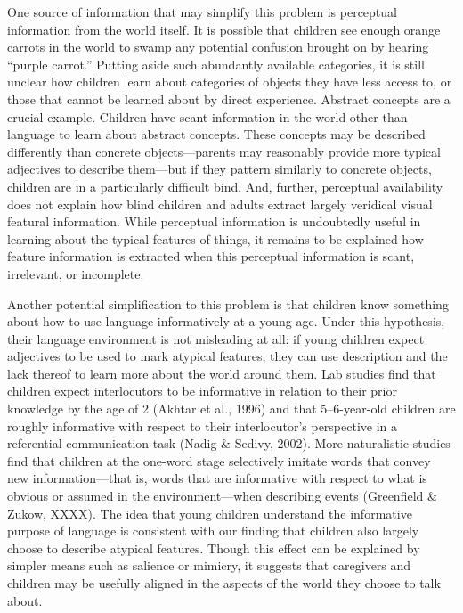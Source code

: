 \documentclass[10pt, letterpaper]{article}
\begin{document}
One source of information that may simplify this problem is perceptual
information from the world itself. It is possible that children see
enough orange carrots in the world to swamp any potential confusion
brought on by hearing ``purple carrot.'' Putting aside such abundantly
available categories, it is still unclear how children learn about
categories of objects they have less access to, or those that cannot be
learned about by direct experience. Abstract concepts are a crucial
example. Children have scant information in the world other than
language to learn about abstract concepts. These concepts may be
described differently than concrete objects---parents may reasonably
provide more typical adjectives to describe them---but if they pattern
similarly to concrete objects, children are in a particularly difficult
bind. And, further, perceptual availability does not explain how blind
children and adults extract largely veridical visual featural
information. While perceptual information is undoubtedly useful in
learning about the typical features of things, it remains to be
explained how feature information is extracted when this perceptual
information is scant, irrelevant, or incomplete.

Another potential simplification to this problem is that children know
something about how to use language informatively at a young age. Under
this hypothesis, their language environment is not misleading at all: if
young children expect adjectives to be used to mark atypical features,
they can use description and the lack thereof to learn more about the
world around them. Lab studies find that children expect interlocutors
to be informative in relation to their prior knowledge by the age of 2
(Akhtar et al., 1996) and that 5--6-year-old children are roughly
informative with respect to their interlocutor's perspective in a
referential communication task (Nadig \& Sedivy, 2002). More
naturalistic studies find that children at the one-word stage
selectively imitate words that convey new information---that is, words
that are informative with respect to what is obvious or assumed in the
environment---when describing events (Greenfield \& Zukow, XXXX). The
idea that young children understand the informative purpose of language
is consistent with our finding that children also largely choose to
describe atypical features. Though this effect can be explained by
simpler means such as salience or mimicry, it suggests that caregivers
and children may be usefully aligned in the aspects of the world they
choose to talk about.
\end{document}
